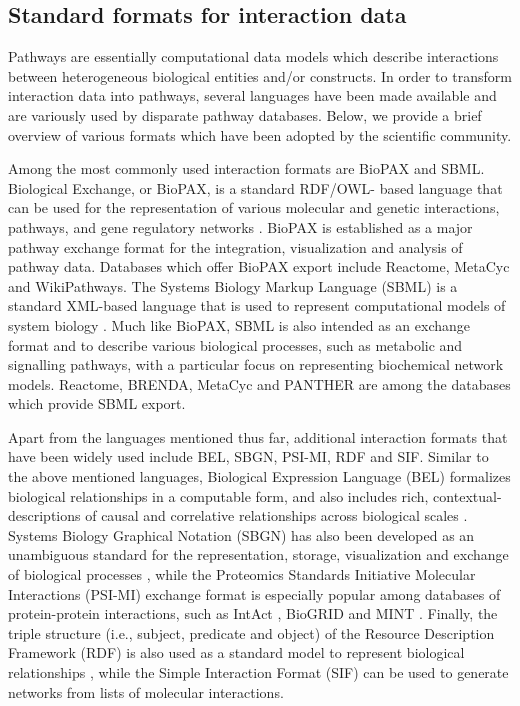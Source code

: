 \subsection{Standard formats for interaction data }

Pathways are essentially computational data models which describe interactions between heterogeneous biological entities and/or constructs. In order to transform interaction data into pathways, several languages have been made available and are variously used by disparate pathway databases. Below, we provide a brief overview of various formats which have been adopted by the scientific community.

Among the most commonly used interaction formats are BioPAX and SBML. Biological  Exchange, or BioPAX, is a standard RDF/OWL- based language that can be used for the representation of various molecular and genetic interactions, pathways, and gene regulatory networks \parencite{demir2010}. BioPAX is established as a major pathway exchange format for the integration, visualization and analysis of pathway data. Databases which offer BioPAX export include Reactome, MetaCyc and WikiPathways. The Systems Biology Markup Language (SBML) is a standard XML-based language that is used to represent computational models of system biology \parencite{hucka2003}. Much like BioPAX, SBML is also intended as an exchange format and to describe various biological processes, such as metabolic and signalling pathways, with a particular focus on representing biochemical network models. Reactome, BRENDA, MetaCyc and PANTHER are among the databases which provide SBML export. 

Apart from the languages mentioned thus far, additional interaction formats that have been widely used include BEL, SBGN, PSI-MI, RDF and SIF. Similar to the above mentioned languages, Biological Expression Language (BEL) formalizes biological relationships in a computable form, and also includes rich, contextual-descriptions of causal and correlative relationships across biological scales \parencite{slater2012}. Systems Biology Graphical Notation (SBGN) has also been developed as an unambiguous standard for the representation, storage, visualization and exchange of biological processes \parencite{novere2009}, while the Proteomics Standards Initiative Molecular Interactions (PSI-MI) \parencite{hermjakob2004} exchange format is especially popular among databases of protein-protein interactions, such as IntAct \parencite{del2022}, BioGRID \parencite{oughtred2021} and MINT \parencite{calderone2020}. Finally, the triple structure (i.e., subject, predicate and object) of the Resource Description Framework (RDF) is also used as a standard model to represent biological relationships \parencite{miller2018}, while the Simple Interaction Format (SIF) can be used to generate networks from lists of molecular interactions. 

